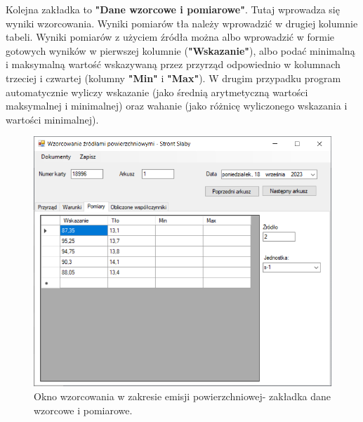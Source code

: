 	Kolejna zakładka to \textbf{"Dane wzorcowe i pomiarowe"}. Tutaj wprowadza się wyniki wzorcowania. Wyniki pomiarów tła należy wprowadzić w drugiej kolumnie tabeli. Wyniki pomiarów z użyciem źródła można albo wprowadzić w formie gotowych wyników w pierwszej kolumnie (\textbf{"Wskazanie"}), albo podać minimalną i maksymalną wartość wskazywaną przez przyrząd odpowiednio w kolumnach trzeciej i czwartej (kolumny \textbf{"Min"} i \textbf{"Max"}). W drugim przypadku program automatycznie wyliczy wskazanie (jako średnią arytmetyczną wartości maksymalnej i minimalnej) oraz wahanie (jako różnicę wyliczonego wskazania i wartości minimalnej).
	
	\begin{figure}[htb]
		\centering
		\includegraphics[width=\columnwidth]{obrazki/Wzorcowanie/emisja/dane.png}
		\caption{Okno wzorcowania w zakresie emisji powierzchniowej- zakładka dane wzorcowe i pomiarowe.}
		\label{emisjaDane}
	\end{figure}
	
